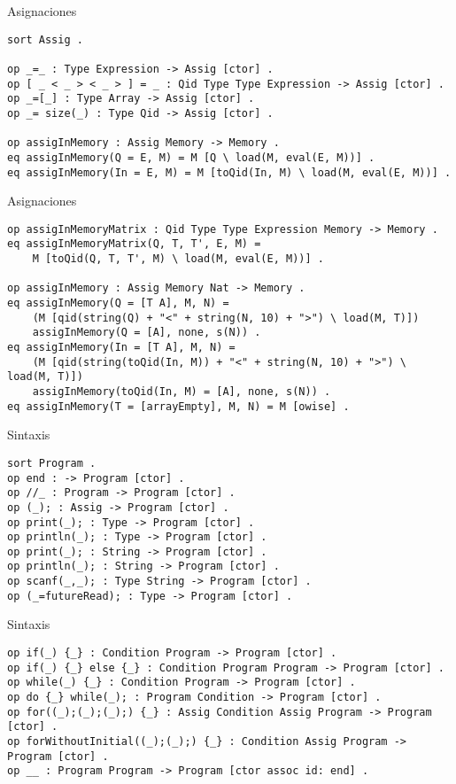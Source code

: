 \documentclass{beamer}
\begin{document}
    \begin{frame}[fragile]{Asignaciones}
        \begin{verbatim}
sort Assig .
 
op _=_ : Type Expression -> Assig [ctor] .
op [ _ < _ > < _ > ] = _ : Qid Type Type Expression -> Assig [ctor] .
op _=[_] : Type Array -> Assig [ctor] .
op _= size(_) : Type Qid -> Assig [ctor] .

op assigInMemory : Assig Memory -> Memory .
eq assigInMemory(Q = E, M) = M [Q \ load(M, eval(E, M))] .
eq assigInMemory(In = E, M) = M [toQid(In, M) \ load(M, eval(E, M))] .
        \end{verbatim}
    \end{frame}

    \begin{frame}[fragile]{Asignaciones}
        \begin{verbatim}
op assigInMemoryMatrix : Qid Type Type Expression Memory -> Memory .
eq assigInMemoryMatrix(Q, T, T', E, M) = 
    M [toQid(Q, T, T', M) \ load(M, eval(E, M))] .
        
op assigInMemory : Assig Memory Nat -> Memory .
eq assigInMemory(Q = [T A], M, N) = 
    (M [qid(string(Q) + "<" + string(N, 10) + ">") \ load(M, T)]) 
    assigInMemory(Q = [A], none, s(N)) .
eq assigInMemory(In = [T A], M, N) = 
    (M [qid(string(toQid(In, M)) + "<" + string(N, 10) + ">") \ load(M, T)]) 
    assigInMemory(toQid(In, M) = [A], none, s(N)) .
eq assigInMemory(T = [arrayEmpty], M, N) = M [owise] .
        \end{verbatim}
    \end{frame}

    \begin{frame}[fragile]{Sintaxis}
        \begin{verbatim}
sort Program .
op end : -> Program [ctor] .
op //_ : Program -> Program [ctor] .
op (_); : Assig -> Program [ctor] .
op print(_); : Type -> Program [ctor] .
op println(_); : Type -> Program [ctor] .
op print(_); : String -> Program [ctor] .
op println(_); : String -> Program [ctor] .
op scanf(_,_); : Type String -> Program [ctor] .
op (_=futureRead); : Type -> Program [ctor] .
        \end{verbatim}
    \end{frame}

    \begin{frame}[fragile]{Sintaxis}
        \begin{verbatim}  
op if(_) {_} : Condition Program -> Program [ctor] .
op if(_) {_} else {_} : Condition Program Program -> Program [ctor] .
op while(_) {_} : Condition Program -> Program [ctor] .
op do {_} while(_); : Program Condition -> Program [ctor] .
op for((_);(_);(_);) {_} : Assig Condition Assig Program -> Program [ctor] .
op forWithoutInitial((_);(_);) {_} : Condition Assig Program -> Program [ctor] .
op __ : Program Program -> Program [ctor assoc id: end] .
        \end{verbatim}
    \end{frame}
\end{document}
